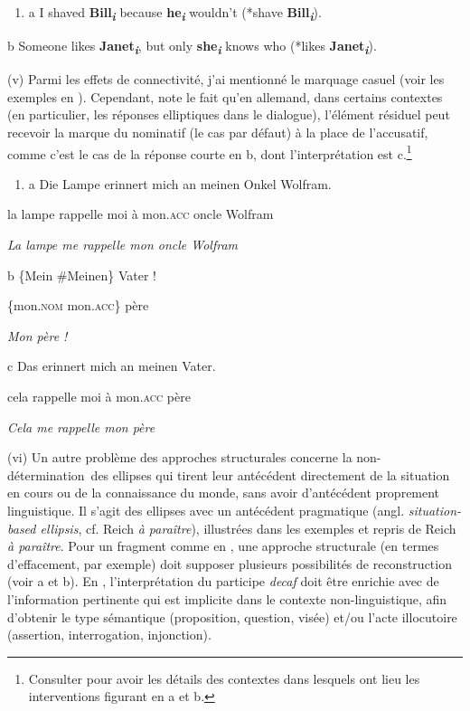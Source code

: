 \begin{enumerate}
\item \label{bkm:Ref306042682}a  I shaved \textbf{Bill}\textbf{\textit{\textsubscript{i}}} because \textbf{he}\textbf{\textit{\textsubscript{i}}} wouldn't (*shave \textbf{Bill}\textbf{\textit{\textsubscript{i}}}). 


\end{enumerate}
  b  Someone likes \textbf{Janet}\textbf{\textit{\textsubscript{i}}}, but only \textbf{she}\textbf{\textit{\textsubscript{i}}} knows who (*likes \textbf{Janet}\textbf{\textit{\textsubscript{i}}}).

(v) Parmi les effets de connectivité, j'ai mentionné le marquage casuel (voir les exemples en ). Cependant, \citet{Stainton2006} note le fait qu'en allemand, dans certains contextes (en particulier, les réponses elliptiques dans le dialogue), l'élément résiduel peut recevoir la marque du nominatif (le cas par défaut) à la place de l'accusatif, comme c'est le cas de la réponse courte en b, dont l'interprétation est c.\footnote{Consulter \citet{Stainton2006} pour avoir les détails des contextes dans lesquels ont lieu les interventions figurant en a et b. }  


\begin{enumerate}
\item \label{bkm:Ref305964211}a  Die  Lampe  erinnert  mich  an  meinen  Onkel  Wolfram.  


\end{enumerate}
  la  lampe  rappelle  moi  à  mon.\textsc{acc}  oncle  Wolfram

{\itshape
La lampe me rappelle mon oncle Wolfram} 

b  \{Mein  {\textbar} \#Meinen\}  Vater !

  \{mon.\textsc{nom  {\textbar}} mon.\textsc{acc\}}  père  

{\itshape
  Mon père !}

c  Das  erinnert  mich  an  meinen  Vater.

  cela  rappelle  moi  à  mon.\textsc{acc}  père  

  \textit{Cela me rappelle mon père}

(vi) Un autre problème des approches structurales concerne la non-détermination~des ellipses qui tirent leur antécédent directement de la situation en cours ou de la connaissance du monde, sans avoir d'antécédent proprement linguistique. Il s'agit des ellipses avec un antécédent pragmatique (angl. \textit{situation-based ellipsis}, cf. Reich \textit{à paraître}), illustrées dans les exemples  et  repris de Reich \textit{à paraître}. Pour un fragment comme en , une approche structurale (en termes d'effacement, par exemple) doit supposer plusieurs possibilités de reconstruction (voir a et b). En , l'interprétation du participe \textit{decaf} doit être enrichie avec de l'information pertinente qui est implicite dans le contexte non-linguistique, afin d'obtenir le type sémantique (proposition, question, visée) et/ou l'acte illocutoire (assertion, interrogation, injonction).



